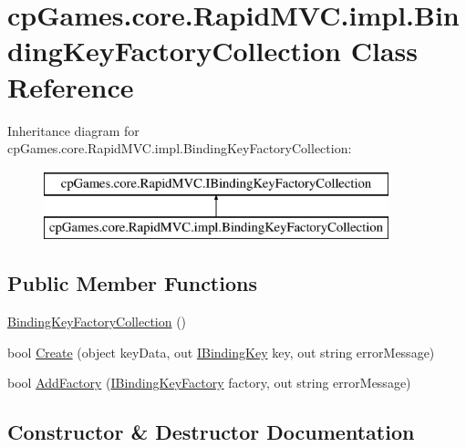 \hypertarget{classcp_games_1_1core_1_1_rapid_m_v_c_1_1impl_1_1_binding_key_factory_collection}{}\section{cp\+Games.\+core.\+Rapid\+M\+V\+C.\+impl.\+Binding\+Key\+Factory\+Collection Class Reference}
\label{classcp_games_1_1core_1_1_rapid_m_v_c_1_1impl_1_1_binding_key_factory_collection}
Inheritance diagram for cp\+Games.\+core.\+Rapid\+M\+V\+C.\+impl.\+Binding\+Key\+Factory\+Collection\+:\begin{figure}[H]
\begin{center}
\leavevmode
\includegraphics[height=2.000000cm]{classcp_games_1_1core_1_1_rapid_m_v_c_1_1impl_1_1_binding_key_factory_collection}
\end{center}
\end{figure}
\subsection*{Public Member Functions}
\begin{DoxyCompactItemize}
\item 
\mbox{\hyperlink{classcp_games_1_1core_1_1_rapid_m_v_c_1_1impl_1_1_binding_key_factory_collection_acb92eb1f1cf3fa4f00a41d174f2d3e26}{Binding\+Key\+Factory\+Collection}} ()
\item 
bool \mbox{\hyperlink{classcp_games_1_1core_1_1_rapid_m_v_c_1_1impl_1_1_binding_key_factory_collection_a63ede48e3fa4b488ca0537e37fe3e086}{Create}} (object key\+Data, out \mbox{\hyperlink{interfacecp_games_1_1core_1_1_rapid_m_v_c_1_1_i_binding_key}{I\+Binding\+Key}} key, out string error\+Message)
\item 
bool \mbox{\hyperlink{classcp_games_1_1core_1_1_rapid_m_v_c_1_1impl_1_1_binding_key_factory_collection_a401eb3e5efc28299218f217695a40718}{Add\+Factory}} (\mbox{\hyperlink{interfacecp_games_1_1core_1_1_rapid_m_v_c_1_1_i_binding_key_factory}{I\+Binding\+Key\+Factory}} factory, out string error\+Message)
\end{DoxyCompactItemize}


\subsection{Constructor \& Destructor Documentation}
\mbox{\label{classcp_games_1_1core_1_1_rapid_m_v_c_1_1impl_1_1_binding_key_factory_collection_acb92eb1f1cf3fa4f00a41d174f2d3e26}} 
